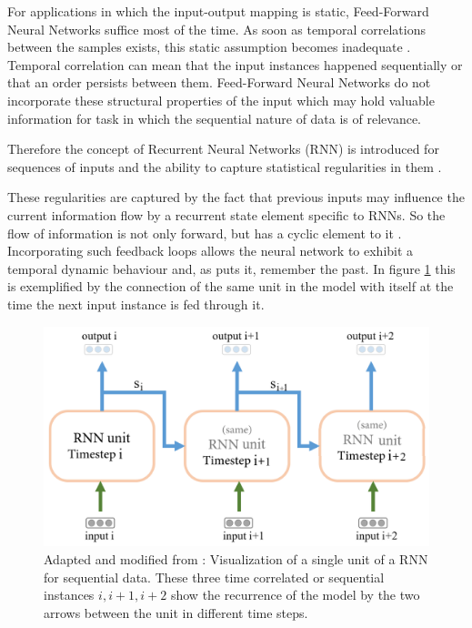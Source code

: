 For applications in which the input-output mapping is static, Feed-Forward Neural Networks suffice most of the time.
As soon as temporal correlations between the samples exists, this static assumption becomes inadequate \citep{tsoi1997recurrent}. 
Temporal correlation can mean that the input instances happened sequentially or that an order persists between them. 
Feed-Forward Neural Networks do not incorporate these structural properties of the input which may hold valuable information for task in which the sequential nature of data is of relevance.

Therefore the concept of Recurrent Neural Networks (RNN) is introduced for sequences of inputs and the ability to capture statistical regularities in them \citep{goldberg2017neural}.

These regularities are captured by the fact that previous inputs may influence the current information flow by a recurrent state element specific to RNNs. 
So the flow of information is not only forward, but has a cyclic element to it \citep{jurafsky2021}. 
Incorporating such feedback loops allows the neural network to exhibit a temporal dynamic behaviour and, as \citet{embedding2020pilehvar} puts it, remember the past. 
In figure \ref{fig:RNN_1} this is exemplified by the connection of the same unit in the model with itself at the time the next input instance is fed through it.

\begin{figure}
  \includegraphics[width=\linewidth]{Pictures/Pilehvar_20_RNN.png}
  \caption{Adapted and modified from \citet{embedding2020pilehvar}: Visualization of a single unit of a RNN for sequential data. These three time correlated or sequential instances $i, i+1, i+2$ show the recurrence of the model by the two arrows between the unit in different time steps.}
  \label{fig:RNN_1}
\end{figure}


